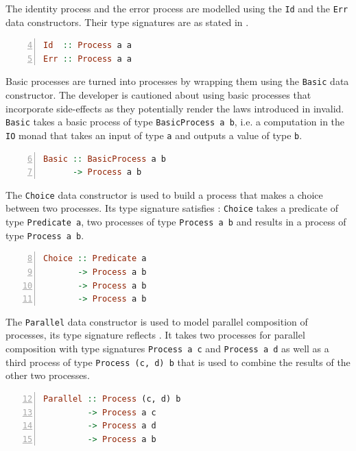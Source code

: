 The identity process and the error process are modelled using the \texttt{Id} and the \texttt{Err} data constructors. Their type signatures are as stated in .
\begin{lstlisting}[language=Haskell,caption=Data constructors for the id and error process.,label=fig:local_datatypes,numbers=left,frame=bt,firstnumber=4]
Id  :: Process a a
Err :: Process a a
\end{lstlisting}

Basic processes are turned into processes by wrapping them using the \texttt{Basic} data constructor. The developer is cautioned about using basic processes that incorporate side-effects as they potentially render the laws introduced in  invalid. \texttt{Basic} takes a basic process of type \texttt{BasicProcess a b}, i.e. a computation in the \texttt{IO} monad that takes an input of type \texttt{a} and outputs a value of type \texttt{b}.
\begin{lstlisting}[language=Haskell,caption=Signature of the \texttt{Basic} data constructor.,numbers=left,frame=bt,firstnumber=6]
Basic :: BasicProcess a b
      -> Process a b
\end{lstlisting}

The \texttt{Choice} data constructor is used to build a process that makes a choice between two processes. Its type signature satisfies : \texttt{Choice} takes a predicate of type \texttt{Predicate a}, two processes of type \texttt{Process a b} and results in a process of type \texttt{Process a b}.
\begin{lstlisting}[language=Haskell,caption=Signature of the \texttt{Choice} data constructor.,numbers=left,frame=bt,firstnumber=8]
Choice :: Predicate a
       -> Process a b
       -> Process a b
       -> Process a b
\end{lstlisting}

The \texttt{Parallel} data constructor is used to model parallel composition of processes, its type signature reflects . It takes two processes for parallel composition with type signatures \texttt{Process a c} and \texttt{Process a d} as well as a third process of type \texttt{Process (c, d) b} that is used to combine the results of the other two processes.
\begin{lstlisting}[language=Haskell,caption=Signature of the \texttt{Parallel} data constructor.,numbers=left,frame=bt,firstnumber=12]
Parallel :: Process (c, d) b
         -> Process a c
         -> Process a d
         -> Process a b
\end{lstlisting}

